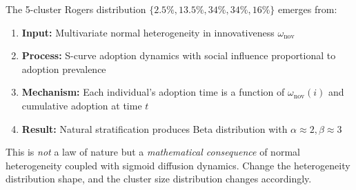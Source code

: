 \begin{proposition}
The 5-cluster Rogers distribution $\{2.5\%, 13.5\%, 34\%, 34\%, 16\%\}$ emerges from:
\begin{enumerate}[nosep]
\item \textbf{Input:} Multivariate normal heterogeneity in innovativeness $\omega_{\text{nov}}$
\item \textbf{Process:} S-curve adoption dynamics with social influence proportional to adoption prevalence
\item \textbf{Mechanism:} Each individual's adoption time is a function of $\omega_{\text{nov}}(i)$ and cumulative adoption at time $t$
\item \textbf{Result:} Natural stratification produces Beta distribution with $\alpha \approx 2, \beta \approx 3$
\end{enumerate}
This is \textit{not} a law of nature but a \textit{mathematical consequence} of normal heterogeneity
coupled with sigmoid diffusion dynamics. Change the heterogeneity distribution shape, and the
cluster size distribution changes accordingly.
\cite{rogers2003diffusion, montoya2003extensions}
\end{proposition}

